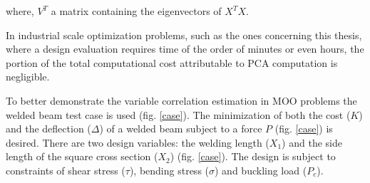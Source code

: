where, $V^T$ a matrix containing the eigenvectors of $X^TX$.

In industrial scale optimization problems, such as the ones concerning this thesis, where a design evaluation requires time of the order of minutes or even hours, the portion of the total computational cost attributable to PCA computation is negligible.
 


To better demonstrate the variable correlation estimation in MOO problems  the welded beam test case is used (fig. \ref{case}).  The minimization of both the cost ($K$) and the deflection ($\Delta$) of a welded beam subject to a force $P$ (fig. \ref{case}) is desired. There are two design variables: the welding length ($X_1$)  and the side length of the square cross section ($X_2$) (fig. \ref{case}). The design is subject to constraints of shear stress ($\tau$), bending stress ($\sigma$) and buckling load ($P_c$).    

